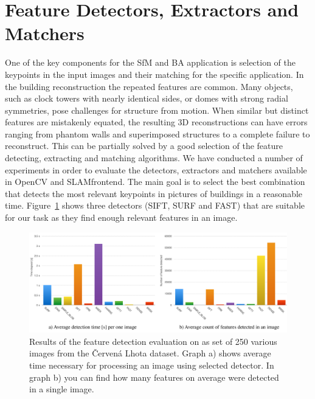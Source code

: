 \section{Feature Detectors, Extractors and Matchers}
\label{sec:experiments-extractors}
One of the key components for the SfM and BA application is selection of the keypoints in the input images and their matching for the specific application.  In the building reconstruction the repeated features are common. Many objects, such as clock towers with nearly identical sides, or domes with strong radial symmetries, pose challenges for structure from motion. When similar but distinct features are mistakenly equated, the resulting 3D reconstructions can have errors ranging from phantom walls and superimposed structures to a complete failure to reconstruct. This can be partially solved by a good selection of the feature detecting, extracting and matching algorithms. We have conducted a number of experiments in order to evaluate the detectors, extractors and matchers available in OpenCV and SLAM\textunderscore frontend. The main goal is to select the best combination that detects the most relevant keypoints in pictures of buildings in a reasonable time. Figure~\ref{fig:detectors} shows three detectors (SIFT, SURF and FAST) that are suitable for our task as they find enough relevant features in an image.

\begin{figure}[!htbp]
	\begin{center}
		\includegraphics[keepaspectratio,width=\textwidth]{fig/detectors.pdf}
	\end{center}
	\caption{Results of the feature detection evaluation on as set of 250 various images from the Červená Lhota dataset. Graph a) shows average time necessary for processing an image using selected detector. In graph b) you can find how many features on average were detected in a single image.}
	\label{fig:detectors}
\end{figure}

